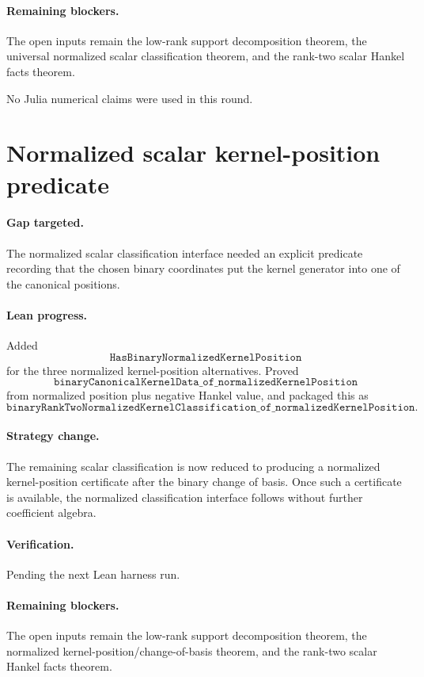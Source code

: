 \documentclass[11pt]{article}
\begin{document}
\paragraph{Remaining blockers.}
The open inputs remain the low-rank support decomposition theorem, the
universal normalized scalar classification theorem, and the rank-two scalar
Hankel facts theorem.

No Julia numerical claims were used in this round.

\section*{Normalized scalar kernel-position predicate}

\paragraph{Gap targeted.}
The normalized scalar classification interface needed an explicit predicate
recording that the chosen binary coordinates put the kernel generator into one
of the canonical positions.

\paragraph{Lean progress.}
Added
\[
\texttt{HasBinaryNormalizedKernelPosition}
\]
for the three normalized kernel-position alternatives.  Proved
\[
\texttt{binaryCanonicalKernelData\_of\_normalizedKernelPosition}
\]
from normalized position plus negative Hankel value, and packaged this as
\[
\texttt{binaryRankTwoNormalizedKernelClassification\_of\_normalizedKernelPosition}.
\]

\paragraph{Strategy change.}
The remaining scalar classification is now reduced to producing a normalized
kernel-position certificate after the binary change of basis.  Once such a
certificate is available, the normalized classification interface follows
without further coefficient algebra.

\paragraph{Verification.}
Pending the next Lean harness run.

\paragraph{Remaining blockers.}
The open inputs remain the low-rank support decomposition theorem, the
normalized kernel-position/change-of-basis theorem, and the rank-two scalar
Hankel facts theorem.
\end{document}

